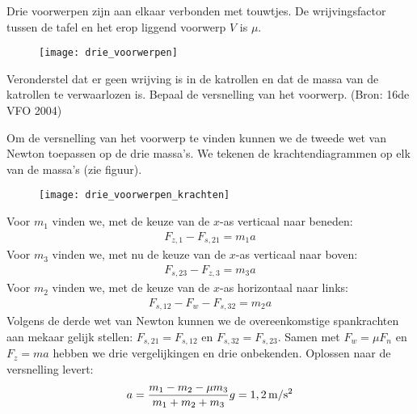 
\begin{exercise}




 Drie voorwerpen zijn aan elkaar verbonden met touwtjes. De wrij\-vings\-factor tussen de tafel en het erop liggend voorwerp $V$ is $\mu$.
\begin{figure}[h]
\begin{center}
\texttt{[image: drie\_voorwerpen]}
\end{center}
\end{figure}
Veronderstel dat er geen wrijving is in de katrollen en dat de massa van de katrollen te verwaarlozen is. Bepaal de versnelling van het voorwerp. (Bron: 16de VFO 2004)
\begin{oplossing}
\newline
Om de versnelling van het voorwerp te vinden kunnen we de tweede wet van Newton toepassen op de drie massa's. We tekenen de krachtendiagrammen op elk van de massa's (zie figuur). 
\begin{figure}[h]
\begin{center}
\texttt{[image: drie\_voorwerpen\_krachten]}
\end{center}
\end{figure}
\newline
Voor $m_1$ vinden we, met de keuze van de $x$-as verticaal naar beneden:
\begin{eqnarray}
F_{z,1}-F_{s,21}=m_1a\label{m_1}
\end{eqnarray}
Voor $m_3$ vinden we, met nu de keuze van de $x$-as verticaal naar boven:
\begin{eqnarray}
F_{s,23}-F_{z,3}=m_3a\label{m_3}
\end{eqnarray}
Voor $m_2$ vinden we, met de keuze van de $x$-as horizontaal naar links:
\begin{eqnarray}
F_{s,12}-F_w-F_{s,32}=m_2a\label{m_2}
\end{eqnarray}
Volgens de derde wet van Newton kunnen we de overeenkomstige spankrachten aan mekaar gelijk stellen: $F_{s,21}=F_{s,12}$ en $F_{s,32}=F_{s,23}$. Samen met $F_w=\mu F_n$ en $F_z=ma$ hebben we drie vergelijkingen en drie onbekenden. Oplossen naar de versnelling levert:
\begin{eqnarray*}
a=\frac{m_1-m_2-\mu m_3}{m_1+m_2+m_3}g=1,2\rm\,m/s^2
\end{eqnarray*}
\newline
\newline

\end{oplossing}
\end{exercise}
